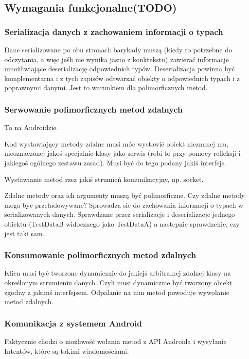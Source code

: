 \subsection{Wymagania funkcjonalne(TODO)}

\subsubsection{Serializacja danych z zachowaniem informacji o typach}
Dane serializowane po obu stronach barykady muszą (kiedy to potrzebne do odczytania, a więc jeśli nie wynika jasno z konktekstu) zawierać informacje umożliwiające deserializację odpowiednich typów.
Deserializacja powinna być komplementarna i z tych zapisów odtwarzać obiekty o odpowiednich typach i z poprawnymi danymi.
Jest to warunkiem dla polimorficznych metod.

\subsubsection{Serwowanie polimorficznych metod zdalnych}
To na Androidzie.

Kod wystawiający metody zdalne musi móc wystawić obiekt nieznanej mu, nieoznaczonej jakoś specjalnie klasy jako serwis (robi to przy pomocy refleksji i jakiegoś ogólnego zestawu zasad). Musi być do tego podany jakiś interfejs.

Wystawianie metod rzez jakiś strumień komunikacyjny, np. socket.


Zdalne metody oraz ich argumenty muszą być polimorficzne.
Czy zdalne metody moga byc przeładowywane?
Sprowadza sie do zachowania informacji o typach
w serializowanych danych. Sprawdzane przez serializacje
i deserializacje jednego obiektu (TestDataB widocznego
jako TestDataA) a nastepnie sprawdzenie,
czy jest taki sam.

\subsubsection{Konsumowanie polimorficznych metod zdalnych}
Klien musi być tworzone dynamicznie do jakiejś arbitralnej zdalnej klasy na określonym strumieniu danych. Czyli musi dynamicznie być tworzony obiekt zgodny z jakimś interfejsem. Odpalanie na nim metod powoduje wywołanie metod zdalnych.

\subsubsection{Komunikacja z systemem Android}
Faktycznie chodzi o możliwość wołania metod z API Androida i wysyłanie Intentów, które są takimi wiadomościami.

